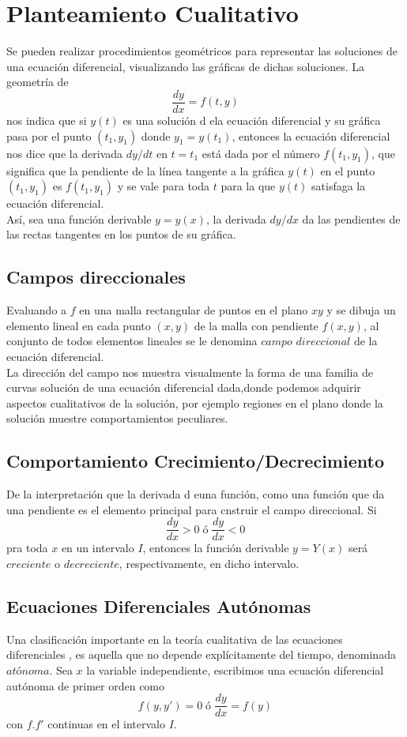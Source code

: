 \documentclass[10pt,a4paper,notitlepage]{report}
\begin{document}
\section{Planteamiento Cualitativo}
Se pueden realizar procedimientos geométricos para representar las soluciones de una ecuación diferencial, visualizando las gráficas de dichas soluciones. La geometría de
\begin{equation}
\frac{dy}{dx} = f(t, y)
\end{equation}
nos indica que si $y(t)$ es una solución d ela ecuación diferencial y su gráfica pasa por el punto $(t_{1}, y_{1})$ donde $y_{1} = y(t_{1})$, entonces la ecuación diferencial nos dice que la derivada $dy/dt$ en $t=t_{1}$ está dada por el número $f(t_{1}, y_{1})$, que significa que la pendiente de la línea tangente a la gráfica $y(t)$ en el punto $(t_{1}, y_{1})$ es $f(t_{1}, y_{1})$ y se vale para toda $t$ para la que $y(t)$ satisfaga la ecuación diferencial. \\
Así, sea una función derivable $y = y(x)$, la derivada $dy/ dx$ da las pendientes de las rectas tangentes en los puntos de su gráfica.
\subsection{Campos direccionales}
Evaluando a $f$ en una malla rectangular de puntos en el plano $xy$ y se dibuja un elemento lineal en cada punto $(x, y)$ de la malla con pendiente $f(x, y)$, al conjunto de todos elementos lineales se le denomina $campo$ $direccional$ de la ecuación diferencial. \\
 La dirección del campo nos muestra visualmente la forma de una familia de curvas solución de una ecuación diferencial dada,donde podemos adquirir aspectos cualitativos de la solución, por ejemplo regiones en el plano donde la solución muestre comportamientos peculiares.
\subsection*{Comportamiento Crecimiento/Decrecimiento}
De la interpretación que la derivada d euna función, como una función que da una pendiente es el elemento principal para cnstruir el campo direccional. Si
\begin{equation}
\frac{dy}{dx} > 0 \; ó \; \frac{dy}{dx} < 0
\end{equation}
pra toda $x$ en un intervalo $I$, entonces la función derivable $y = Y(x)$ será $creciente$ o $decreciente$, respectivamente, en dicho intervalo.
\subsection{Ecuaciones Diferenciales Autónomas} 
Una clasificación importante en la teoría cualitativa de las ecuaciones diferenciales , es aquella que no depende explícitamente del tiempo, denominada $atónoma$. Sea $x$ la variable independiente, escribimos una ecuación diferencial autónoma de primer orden como
\begin{equation}
f(y, y') = 0 \; ó \; \frac{dy}{dx} = f(y)
\end{equation}
con $f. f'$ continuas en el intervalo $I$.
\end{document}
